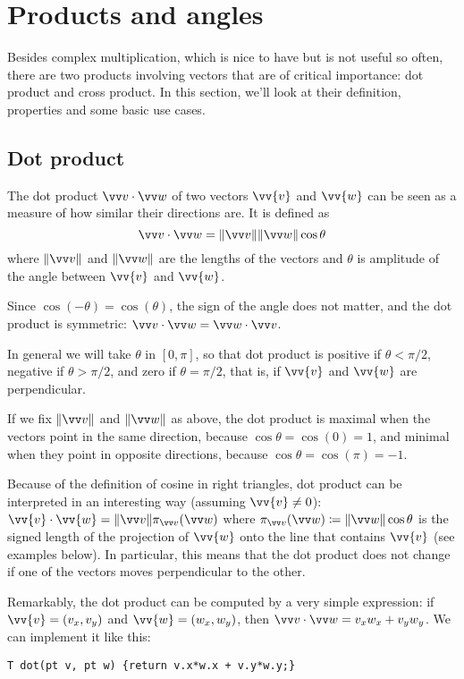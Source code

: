 \section{Products and angles}
Besides complex multiplication, which is nice to have but is not useful so often, there are two products involving vectors that are of critical importance: dot product and cross product. In this section, we'll look at their definition, properties and some basic use cases.

\subsection{Dot product}\label{ss:dot}
The dot product $\dotv{v}{w}$ of two vectors $\vv{v}$ and $\vv{w}$ can be seen as a measure of how similar their directions are. It is defined as \[\dotv{v}{w} = \normv{v}\normv{w} \cos\theta\] where $\normv{v}$ and $\normv{w}$ are the lengths of the vectors and $\theta$ is amplitude of the angle between $\vv{v}$ and $\vv{w}$.

Since $\cos(-\theta) = \cos(\theta)$, the sign of the angle does not matter, and the dot product is symmetric: $\dotv{v}{w} = \dotv{w}{v}$.

In general we will take $\theta$ in $[0,\pi]$, so that dot product is positive if $\theta < \pi/2$, negative if $\theta > \pi/2$, and zero if $\theta = \pi/2$, that is, if $\vv{v}$ and $\vv{w}$ are perpendicular.

If we fix $\normv{v}$ and $\normv{w}$ as above, the dot product is maximal when the vectors point in the same direction, because $\cos\theta = \cos(0) = 1$, and minimal when they point in opposite directions, because $\cos\theta = \cos(\pi) = -1$.

\begin{mathy}
Because of the definition of cosine in right triangles, dot product can be interpreted in an interesting way (assuming $\vv{v} \neq 0$): $\vv{v}\cdot\vv{w} = \normv{v}\projv{v}{w}$ where $\projv{v}{w} \coloneqq \normv{w}\cos\theta$ is the signed length of the projection of $\vv{w}$ onto the line that contains $\vv{v}$ (see examples below).
In particular, this means that the dot product does not change if one of the vectors moves perpendicular to the other.
\end{mathy}

Remarkably, the dot product can be computed by a very simple expression: if $\vv{v} = (v_x, v_y)$ and $\vv{w} = (w_x, w_y)$, then $\dotv{v}{w} = v_xw_x + v_yw_y$. We can implement it like this:
\begin{lstlisting}
T dot(pt v, pt w) {return v.x*w.x + v.y*w.y;}
\end{lstlisting}

